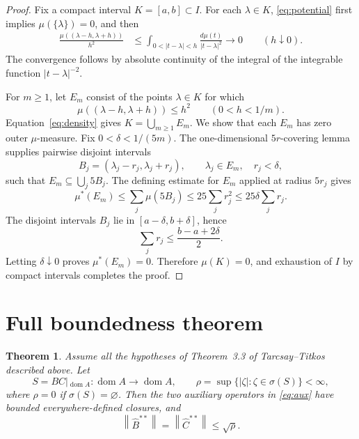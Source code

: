 \documentclass[11pt]{article}
\newtheorem{theorem}{Theorem}
\newcommand{\domA}{\operatorname{dom}A}
\newcommand{\norm}[1]{\left\lVert#1\right\rVert}
\begin{document}
\begin{proof}
Fix a compact interval \(K=[a,b]\subset I\).  For each \(\lambda\in K\),
\eqref{eq:potential} first implies \(\mu(\{\lambda\})=0\), and then
\begin{align}
 \frac{\mu((\lambda-h,\lambda+h))}{h^2}
 &\le
 \int_{0<|t-\lambda|<h}\frac{d\mu(t)}{|t-\lambda|^2}
 \longrightarrow0
 \qquad(h\downarrow0).                                      \label{eq:density}
\end{align}
The convergence follows by absolute continuity of the integral of the
integrable function \(|t-\lambda|^{-2}\).

For \(m\ge1\), let \(E_m\) consist of the points \(\lambda\in K\) for which
\[
 \mu((\lambda-h,\lambda+h))\le h^2
 \qquad(0<h<1/m).
\]
Equation~\eqref{eq:density} gives \(K=\bigcup_{m\ge1}E_m\).  We show that each
\(E_m\) has zero outer \(\mu\)-measure.  Fix
\(0<\delta<1/(5m)\).  The one-dimensional \(5r\)-covering lemma
\cite[Chapter~2]{Mattila} supplies
pairwise disjoint intervals
\[
 B_j=(\lambda_j-r_j,\lambda_j+r_j),
 \qquad \lambda_j\in E_m,\quad r_j<\delta,
\]
such that \(E_m\subseteq\bigcup_j5B_j\).  The defining estimate for \(E_m\)
applied at radius \(5r_j\) gives
\[
 \mu^*(E_m)
 \le\sum_j\mu(5B_j)
 \le25\sum_jr_j^2
 \le25\delta\sum_jr_j.
\]
The disjoint intervals \(B_j\) lie in
\([a-\delta,b+\delta]\), hence
\[
 \sum_jr_j\le\frac{b-a+2\delta}{2}.
\]
Letting \(\delta\downarrow0\) proves \(\mu^*(E_m)=0\).  Therefore
\(\mu(K)=0\), and exhaustion of \(I\) by compact intervals completes the
proof.
\end{proof}

\section*{Full boundedness theorem}

\begin{theorem}\label{thm:main}
Assume all the hypotheses of Theorem~3.3 of Tarcsay--Titkos described above.
Let
\[
 S=BC|_{\domA}:\domA\to\domA,
\qquad
 \rho=\sup\{|\zeta|:\zeta\in\sigma(S)\}<\infty,
\]
where \(\rho=0\) if \(\sigma(S)=\varnothing\).  Then the two auxiliary
operators in \eqref{eq:aux} have bounded everywhere-defined closures, and
\begin{equation}\label{eq:bound}
 \boxed{\quad
 \norm{\widehat B^{**}}
 =\norm{\widehat C^{**}}
 \le\sqrt{\rho}.
 \quad}
\end{equation}
\end{theorem}
\end{document}

